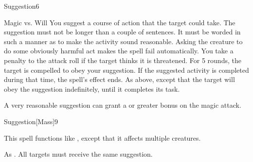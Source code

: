 \begin{spellsection}{Suggestion}{6}
    \begin{spellheader}
    \end{spellheader}
    \begin{spellcontent}
        \begin{spelltargetinginfo}
        \end{spelltargetinginfo}
        \begin{spelleffects}
            \begin{spellattack}{Magic vs. Will}
                \spellspecial You suggest a course of action that the target could take. The suggestion must not be longer than a couple of sentences. It must be worded in such a manner as to make the activity sound reasonable. Asking the creature to do some obviously harmful act makes the spell fail automatically. You take a  penalty to the attack roll if the target thinks it is threatened.
                \spellsuccess For 5 rounds, the target is compelled to obey your suggestion. If the suggested activity is completed during that time, the spell's effect ends.
                \spellcritical As above, except that the target will obey the suggestion indefinitely, until it completes its task.
            \end{spellattack}
        \end{spelleffects}
    \end{spellcontent}
    \begin{spellfooter}
        \spellnotes A very reasonable suggestion can grant a  or greater bonus on the magic attack.

        \norepeatspellnotes
        \miscastrandom
    \end{spellfooter}
\end{spellsection}

\begin{spellsection}{Suggestion}[Mass]{9}
    \begin{spellheader}
    \end{spellheader}
    \begin{spellcontent}
        \begin{spelltargetinginfo}
        \end{spelltargetinginfo}
        \begin{spelleffects}
            \spellspecial This spell functions like , except that it affects multiple creatures.
        \end{spelleffects}
    \end{spellcontent}
    \begin{spellfooter}
        \spellnotes As . All targets must receive the same suggestion.
        \miscastexplode
    \end{spellfooter}
\end{spellsection}

